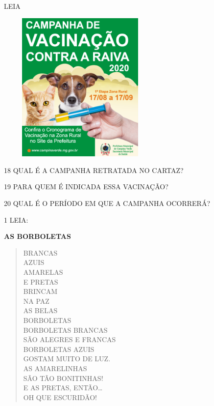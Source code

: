 
LEIA

\includegraphics[width=3.23444in,height=2.93410in]{media/image131.png}

\num{18} QUAL É A CAMPANHA RETRATADA NO CARTAZ?


\num{19} PARA QUEM É INDICADA ESSA VACINAÇÃO?


\num{20} QUAL É O PERÍODO EM QUE A CAMPANHA OCORRERÁ?




\num{1} LEIA:

\textbf{AS BORBOLETAS}

\begin{verse}
BRANCAS\\
AZUIS\\
AMARELAS\\
E PRETAS\\
BRINCAM\\
NA PAZ\\
AS BELAS\\
BORBOLETAS\\
BORBOLETAS BRANCAS\\
SÃO ALEGRES E FRANCAS\\
BORBOLETAS AZUIS\\
GOSTAM MUITO DE LUZ.\\
AS AMARELINHAS\\
SÃO TÃO BONITINHAS!\\
E AS PRETAS, ENTÃO\ldots{}\\
OH QUE ESCURIDÃO!
\end{verse}


